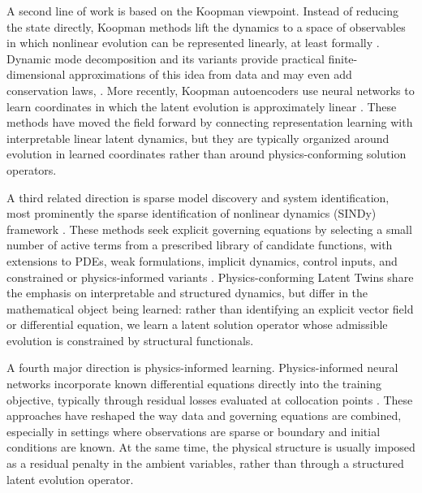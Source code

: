 \documentclass[a4paper,fleqn]{cas-sc}
\theoremstyle{thmstyleone}%
\theoremstyle{thmstyletwo}%
\theoremstyle{thmstylethree}%
\begin{document}
A second line of work is based on the Koopman viewpoint. Instead of reducing the state directly, Koopman methods lift the dynamics to a space of observables in which nonlinear evolution can be represented linearly, at least formally \cite{koopman1931hamiltonian,mezic2005spectral}. Dynamic mode decomposition and its variants provide practical finite-dimensional approximations of this idea from data and may even add conservation laws, \cite{schmid2010dynamic,kutz2016dynamic,baddoo2023physics}. More recently, Koopman autoencoders use neural networks to learn coordinates in which the latent evolution is approximately linear \cite{lusch2018deep,takeishi2017learning}. These methods have moved the field forward by connecting representation learning with interpretable linear latent dynamics, but they are typically organized around evolution in learned coordinates rather than around physics-conforming solution operators.

A third related direction is sparse model discovery and system identification, most prominently the sparse identification of nonlinear dynamics (SINDy) framework \cite{brunton2016discovering}. These methods seek explicit governing equations by selecting a small number of active terms from a prescribed library of candidate functions, with extensions to PDEs, weak formulations, implicit dynamics, control inputs, and constrained or physics-informed variants \cite{rudy2017data,schaeffer2017learning,kaheman2020sindy,reinbold2020using}. Physics-conforming Latent Twins share the emphasis on interpretable and structured dynamics, but differ in the mathematical object being learned: rather than identifying an explicit vector field or differential equation, we learn a latent solution operator whose admissible evolution is constrained by structural functionals.

A fourth major direction is physics-informed learning. Physics-informed neural networks incorporate known differential equations directly into the training objective, typically through residual losses evaluated at collocation points \cite{raissi2019physics,baez2024guaranteeing, patel2022thermodynamically}. These approaches have reshaped the way data and governing equations are combined, especially in settings where observations are sparse or boundary and initial conditions are known. At the same time, the physical structure is usually imposed as a residual penalty in the ambient variables, rather than through a structured latent evolution operator.
\end{document}
